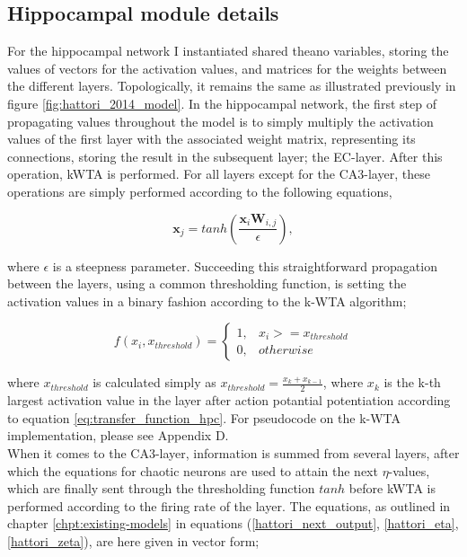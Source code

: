 \subsection{Hippocampal module details}

For the hippocampal network I instantiated shared theano variables, storing the values of vectors for the activation values, and matrices for the weights between the different layers. Topologically, it remains the same as illustrated previously in figure \ref{fig:hattori_2014_model}. In the hippocampal network, the first step of propagating values throughout the model is to simply multiply the activation values of the first layer with the associated weight matrix, representing its connections, storing the result in the subsequent layer; the EC-layer. After this operation, kWTA is performed. For all layers except for the CA3-layer, these operations are simply performed according to the following equations,

\begin{equation}\label{eq:transfer_function_hpc}
    \textbf{x}_j = tanh (\frac{\textbf{x}_i \textbf{W}_{i,j}}{\epsilon}),
\end{equation}

where $\epsilon$ is a steepness parameter. Succeeding this straightforward propagation between the layers, using a common thresholding function, is setting the activation values in a binary fashion according to the k-WTA algorithm;

\begin{equation}
    f(x_i, x_{threshold}) = \begin{cases}
    1, & x_i >= x_{threshold} \\
    0, & otherwise
    \end{cases}
\end{equation}

where $x_{threshold}$ is calculated simply as $x_{threshold} = \frac{x_{k} + x_{k-1}}{2}$, where $x_k$ is the k-th largest activation value in the layer after action potantial potentiation according to equation \ref{eq:transfer_function_hpc}. For pseudocode on the k-WTA implementation, please see Appendix D.
\\

When it comes to the CA3-layer, information is summed from several layers, after which the equations for chaotic neurons are used to attain the next $\eta$-values, which are finally sent through the thresholding function $tanh$ before kWTA is performed according to the firing rate of the layer. The equations, as outlined in chapter \ref{chpt:existing-models} in equations (\ref{hattori_next_output}, \ref{hattori_eta}, \ref{hattori_zeta}), are here given in vector form;

